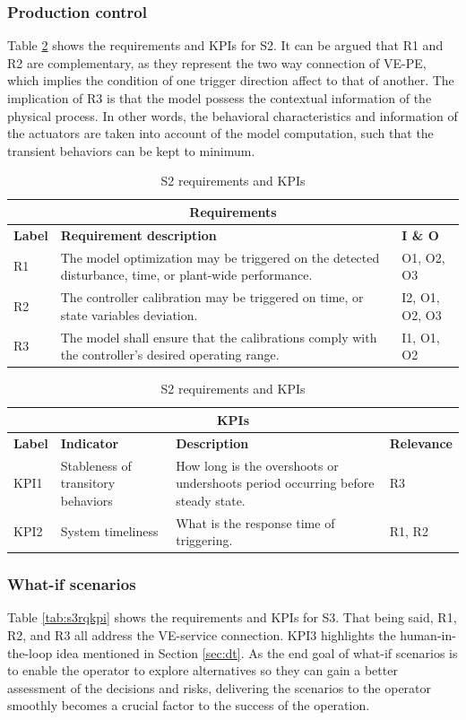 \documentclass[journal,onecolumn]{IEEEtran} %
\begin{document}
\subsubsection{Production control}
Table \ref{tab:s2rqkpi} shows the requirements and KPIs for S2. It can be argued that R1 and R2 are complementary, as they represent the two way connection of VE-PE, which implies the condition of one trigger direction affect to that of another. The implication of R3 is that the model possess the contextual information of the physical process. In other words, the behavioral characteristics and information of the actuators are taken into account of the model computation, such that the transient behaviors can be kept to minimum. 

\begin{table}[hbt!]
\centering
\begin{tabularx}{0.8\textwidth}{|p{1cm}|X|p{1.5cm}|}
\hline
\multicolumn{3}{|c|}{\textbf{Requirements}} \\
\hline
\textbf{Label} & \textbf{Requirement description} & \textbf{I \& O} \\ 
\hline            
R1 & The model optimization may be triggered on the detected disturbance, time, or plant-wide performance. & O1, O2, O3 \\ 
\hline
R2 & The controller calibration may be triggered on time, or state variables deviation. & I2, O1, O2, O3 \\ 
\hline
R3 & The model shall ensure that the calibrations comply with the controller's desired operating range. & I1, O1, O2 \\ 
\hline \hline
\end{tabularx}
\begin{tabularx}{0.8\textwidth}{|p{1cm}|p{2cm}|X|p{1.5cm}|}
\multicolumn{4}{|c|}{\textbf{KPIs}} \\ 
\hline
\textbf{Label} & \textbf{Indicator} & \textbf{Description} & \textbf{Relevance} \\ 
\hline
KPI1 & Stableness of transitory behaviors & How long is the overshoots or undershoots period occurring before steady state. & R3 \\ 
\hline
KPI2 & System timeliness & What is the response time of triggering. & R1, R2 \\ 
\hline
\end{tabularx}
\caption{S2 requirements and KPIs}
\label{tab:s2rqkpi}
\end{table}

\subsubsection{What-if scenarios}
Table \ref{tab:s3rqkpi} shows the requirements and KPIs for S3. That being said, R1, R2, and R3 all address the VE-service connection. KPI3 highlights the human-in-the-loop idea mentioned in Section \ref{sec:dt}. As the end goal of what-if scenarios is to enable the operator to explore alternatives so they can gain a better assessment of the decisions and risks, delivering the scenarios to the operator smoothly becomes a crucial factor to the success of the operation.
\end{document}
